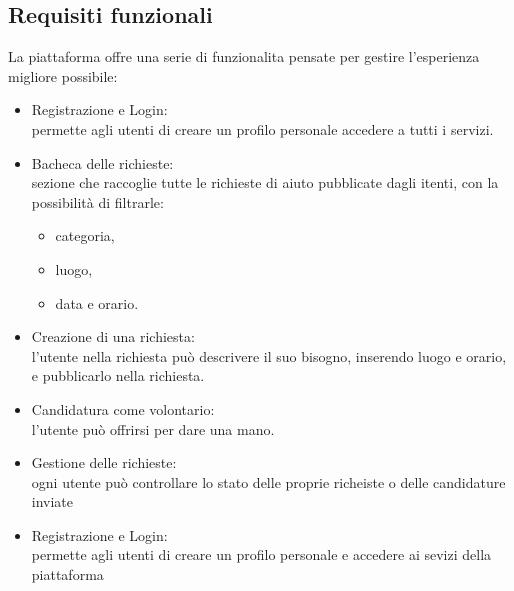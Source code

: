 \documentclass[a4paper,11pt]{article}
\begin{document}
\subsection{Requisiti funzionali}
La piattaforma offre una serie di funzionalita pensate per gestire l'esperienza migliore possibile:
\begin{itemize}
    \item Registrazione e Login:\\permette agli utenti di creare un profilo personale accedere a tutti i servizi.
    \item Bacheca delle richieste:\\sezione che raccoglie tutte le richieste di aiuto pubblicate dagli itenti, con la possibilità di filtrarle:
    \begin{itemize}
        \item categoria,
        \item luogo,
        \item data e orario.
    \end{itemize}
    \item Creazione di una richiesta:\\l'utente nella richiesta può descrivere il suo bisogno, inserendo luogo e orario, e pubblicarlo nella richiesta.
    \item Candidatura come volontario:\\l'utente può offrirsi per dare una mano. 
    \item Gestione delle richieste:\\ogni utente può controllare lo stato delle proprie richeiste o delle candidature inviate
\end{itemize}
\begin{itemize}
    \item Registrazione e Login:\\permette agli utenti di creare un profilo personale e accedere ai sevizi della piattaforma 
\end{itemize}
\end{document}
